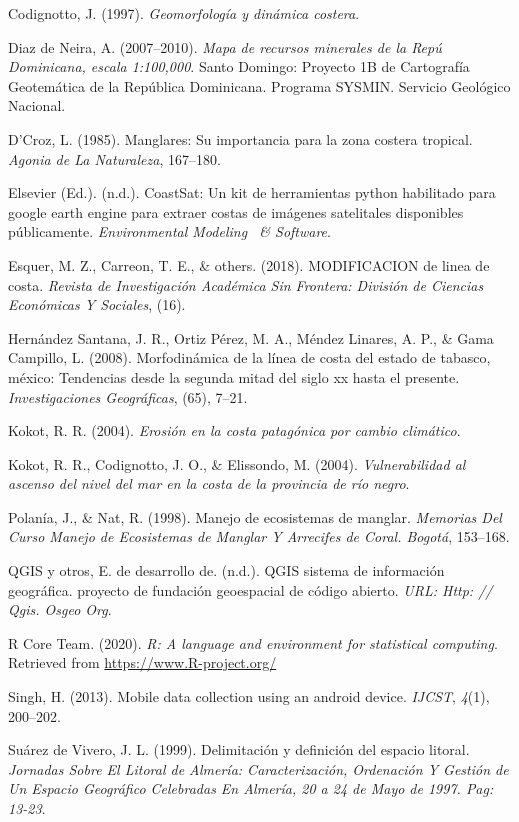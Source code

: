 \documentclass[11pt,]{article}
\begin{document}
\hypertarget{ref-codignotto1997geomorfologia}{}
Codignotto, J. (1997). \emph{Geomorfología y dinámica costera}.

\hypertarget{ref-maparecursosminerales}{}
Diaz de Neira, A. (2007--2010). \emph{Mapa de recursos minerales de la
Repú Dominicana, escala 1:100,000}. Santo Domingo: Proyecto 1B de
Cartografía Geotemática de la República Dominicana. Programa SYSMIN.
Servicio Geológico Nacional.

\hypertarget{ref-d1985manglares}{}
D'Croz, L. (1985). Manglares: Su importancia para la zona costera
tropical. \emph{Agonia de La Naturaleza}, 167--180.

\hypertarget{ref-vos2019coastsat}{}
Elsevier (Ed.). (n.d.). CoastSat: Un kit de herramientas python
habilitado para google earth engine para extraer costas de imágenes
satelitales disponibles públicamente. \emph{Environmental Modeling ~\&
Software}.

\hypertarget{ref-esquer2018modificacion}{}
Esquer, M. Z., Carreon, T. E., \& others. (2018). MODIFICACION de linea
de costa. \emph{Revista de Investigación Académica Sin Frontera:
División de Ciencias Económicas Y Sociales}, (16).

\hypertarget{ref-hernandez2008morfodinamica}{}
Hernández Santana, J. R., Ortiz Pérez, M. A., Méndez Linares, A. P., \&
Gama Campillo, L. (2008). Morfodinámica de la línea de costa del estado
de tabasco, méxico: Tendencias desde la segunda mitad del siglo xx hasta
el presente. \emph{Investigaciones Geográficas}, (65), 7--21.

\hypertarget{ref-kokot2004erosion}{}
Kokot, R. R. (2004). \emph{Erosión en la costa patagónica por cambio
climático}.

\hypertarget{ref-kokot2004vulnerabilidad}{}
Kokot, R. R., Codignotto, J. O., \& Elissondo, M. (2004).
\emph{Vulnerabilidad al ascenso del nivel del mar en la costa de la
provincia de río negro}.

\hypertarget{ref-polania1998manejo}{}
Polanía, J., \& Nat, R. (1998). Manejo de ecosistemas de manglar.
\emph{Memorias Del Curso Manejo de Ecosistemas de Manglar Y Arrecifes de
Coral. Bogotá}, 153--168.

\hypertarget{ref-qgis2015qgis}{}
QGIS y otros, E. de desarrollo de. (n.d.). QGIS sistema de información
geográfica. proyecto de fundación geoespacial de código abierto.
\emph{URL: Http: // Qgis. Osgeo Org}.

\hypertarget{ref-r2020r}{}
R Core Team. (2020). \emph{R: A language and environment for statistical
computing}. Retrieved from \href{\%0Ahttps://www.R-project.org/\%0A}{
https://www.R-project.org/
}

\hypertarget{ref-singh2013mobile}{}
Singh, H. (2013). Mobile data collection using an android device.
\emph{IJCST}, \emph{4}(1), 200--202.

\hypertarget{ref-suarez1999delimitacion}{}
Suárez de Vivero, J. L. (1999). Delimitación y definición del espacio
litoral. \emph{Jornadas Sobre El Litoral de Almería: Caracterización,
Ordenación Y Gestión de Un Espacio Geográfico Celebradas En Almería, 20
a 24 de Mayo de 1997. Pag: 13-23}.




\newpage
\singlespacing 
\end{document}
